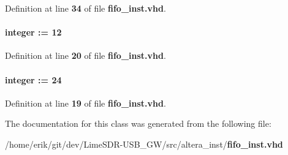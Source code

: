 Definition at line {\bf 34} of file {\bf fifo\+\_\+inst.\+vhd}.

\paragraph[{wrusedw\+\_\+witdth}]{ {\bfseries \textcolor{vhdlchar}{ }} {\bfseries \textcolor{comment}{integer}\textcolor{vhdlchar}{ }\textcolor{vhdlchar}{ }\textcolor{vhdlchar}{\+:}\textcolor{vhdlchar}{=}\textcolor{vhdlchar}{ }\textcolor{vhdlchar}{ } \textcolor{vhdldigit}{12} \textcolor{vhdlchar}{ }} \hspace{0.3cm}{\ttfamily [Generic]}}\label{classfifo__inst_a67fd2d5b4f97714a98e9c732480c3908}


Definition at line {\bf 20} of file {\bf fifo\+\_\+inst.\+vhd}.

\paragraph[{wrwidth}]{ {\bfseries \textcolor{vhdlchar}{ }} {\bfseries \textcolor{comment}{integer}\textcolor{vhdlchar}{ }\textcolor{vhdlchar}{ }\textcolor{vhdlchar}{\+:}\textcolor{vhdlchar}{=}\textcolor{vhdlchar}{ }\textcolor{vhdlchar}{ } \textcolor{vhdldigit}{24} \textcolor{vhdlchar}{ }} \hspace{0.3cm}{\ttfamily [Generic]}}\label{classfifo__inst_a7e4684d2ab6a714b64b479f4e3885491}


Definition at line {\bf 19} of file {\bf fifo\+\_\+inst.\+vhd}.



The documentation for this class was generated from the following file\+:\begin{DoxyCompactItemize}
\item 
/home/erik/git/dev/\+Lime\+S\+D\+R-\/\+U\+S\+B\+\_\+\+G\+W/src/altera\+\_\+inst/{\bf fifo\+\_\+inst.\+vhd}\end{DoxyCompactItemize}
